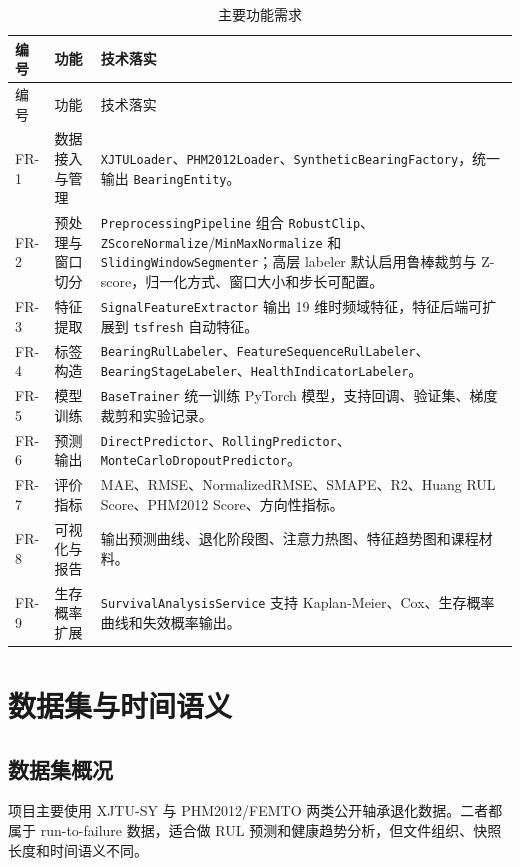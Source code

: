 \documentclass[UTF8,a4paper,12pt]{ctexart}
\newcommand{\code}[1]{\texttt{#1}}
\begin{document}
\begin{longtable}{p{2.2cm}p{4.2cm}p{8.0cm}}
\caption{主要功能需求}\\
\toprule
编号 & 功能 & 技术落实 \\
\midrule
\endfirsthead
\toprule
编号 & 功能 & 技术落实 \\
\midrule
\endhead
FR-1 & 数据接入与管理 & \code{XJTULoader}、\code{PHM2012Loader}、\code{SyntheticBearingFactory}，统一输出 \code{BearingEntity}。 \\
FR-2 & 预处理与窗口切分 & \code{PreprocessingPipeline} 组合 \code{RobustClip}、\code{ZScoreNormalize}/\code{MinMaxNormalize} 和 \code{SlidingWindowSegmenter}；高层 labeler 默认启用鲁棒裁剪与 Z-score，归一化方式、窗口大小和步长可配置。 \\
FR-3 & 特征提取 & \code{SignalFeatureExtractor} 输出 19 维时频域特征，特征后端可扩展到 \code{tsfresh} 自动特征。 \\
FR-4 & 标签构造 & \code{BearingRulLabeler}、\code{FeatureSequenceRulLabeler}、\code{BearingStageLabeler}、\code{HealthIndicatorLabeler}。 \\
FR-5 & 模型训练 & \code{BaseTrainer} 统一训练 PyTorch 模型，支持回调、验证集、梯度裁剪和实验记录。 \\
FR-6 & 预测输出 & \code{DirectPredictor}、\code{RollingPredictor}、\code{MonteCarloDropoutPredictor}。 \\
FR-7 & 评价指标 & MAE、RMSE、NormalizedRMSE、SMAPE、R2、Huang RUL Score、PHM2012 Score、方向性指标。 \\
FR-8 & 可视化与报告 & 输出预测曲线、退化阶段图、注意力热图、特征趋势图和课程材料。 \\
FR-9 & 生存概率扩展 & \code{SurvivalAnalysisService} 支持 Kaplan-Meier、Cox、生存概率曲线和失效概率输出。 \\
\bottomrule
\end{longtable}

\section{数据集与时间语义}

\subsection{数据集概况}

项目主要使用 XJTU-SY 与 PHM2012/FEMTO 两类公开轴承退化数据。二者都属于 run-to-failure 数据，适合做 RUL 预测和健康趋势分析，但文件组织、快照长度和时间语义不同。
\end{document}
